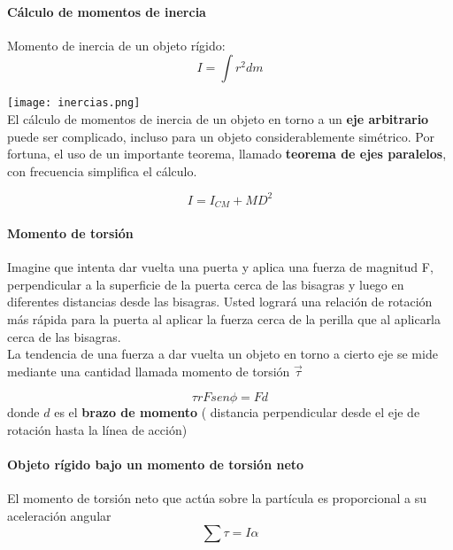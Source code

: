 \documentclass[10pt]{article}
\begin{document}
\paragraph{Cálculo de momentos de inercia}
Momento de inercia de un objeto rígido:
\begin{equation*}
	I = \int r^2 dm
\end{equation*}

\texttt{[image: inercias.png]}\\

El cálculo de momentos de inercia de un objeto en torno a un \textbf{eje arbitrario} puede ser
complicado, incluso para un objeto considerablemente simétrico. Por fortuna, el uso de
un importante teorema, llamado \textbf{teorema de ejes paralelos}, con frecuencia simplifica el
cálculo.

\begin{equation*}
	I = I_{CM} + MD^2
\end{equation*}

\paragraph{Momento de torsión}
Imagine que intenta dar vuelta una puerta y aplica una fuerza de magnitud F, perpendicular a la superficie de la puerta cerca de las bisagras y luego en diferentes distancias desde las bisagras. Usted logrará una relación de rotación más rápida para la puerta al aplicar la fuerza cerca de la perilla que al aplicarla cerca de las bisagras.\\
\linebreak
La tendencia de una fuerza a dar vuelta un objeto en torno a cierto eje se mide mediante una cantidad llamada momento de torsión $\overrightarrow{\tau}$

\begin{equation*}
	\tau rFsen\phi = Fd
\end{equation*}
donde $d$ es el \textbf{brazo de momento} ( distancia perpendicular desde el eje de rotación hasta la línea de acción)
\paragraph{Objeto rígido bajo un momento de torsión neto}
El momento de torsión neto que actúa sobre la partícula es proporcional a su
aceleración angular
\begin{equation*}
	\sum \tau = I\alpha
\end{equation*}
\end{document}
